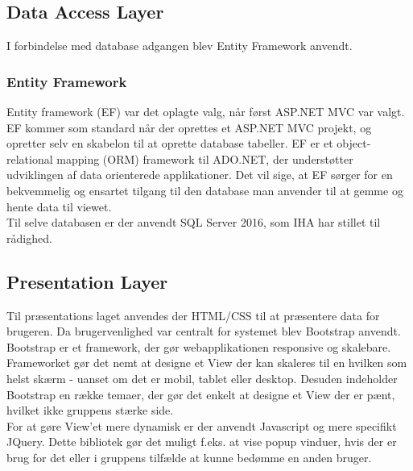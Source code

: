  \subsection{Data Access Layer}
 I forbindelse med database adgangen blev Entity Framework anvendt.
 
 \subsubsection{Entity Framework}
 Entity framework (EF) var det oplagte valg, når først ASP.NET MVC var valgt. EF kommer som standard når der oprettes et ASP.NET MVC projekt, og opretter selv en skabelon til at oprette database tabeller. EF er et object-relational mapping (ORM) framework til ADO.NET, der understøtter udviklingen af data orienterede applikationer. Det vil sige, at EF sørger for en bekvemmelig og ensartet tilgang til den database man anvender til at gemme og hente data til viewet. \\
 \noindent Til selve databasen er der anvendt SQL Server 2016, som IHA har stillet til rådighed.
 
 \subsection{Presentation Layer}
 Til præsentations laget anvendes der HTML/CSS til at præsentere data for brugeren. Da brugervenlighed var centralt for systemet blev Bootstrap anvendt. Bootstrap er et framework, der gør webapplikationen responsive og skalebare. Frameworket gør det nemt at designe et View der kan skaleres til en hvilken som helst skærm - uanset om det er mobil, tablet eller desktop. Desuden indeholder Bootstrap en række temaer, der gør det enkelt at designe et View der er pænt, hvilket ikke gruppens stærke side. \\
 For at gøre View'et mere dynamisk er der anvendt Javascript og mere specifikt JQuery. 
 Dette bibliotek gør det muligt f.eks. at vise popup vinduer, hvis der er brug for det eller i gruppens tilfælde at kunne bedømme en anden bruger.